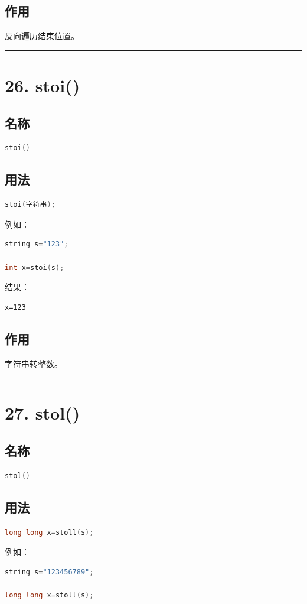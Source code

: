 \documentclass[9pt,twocolumn]{extarticle}
\begin{document}
\subsection{作用}
反向遍历结束位置。

\noindent\rule{\linewidth}{0.4pt}

\section{26. stoi()}

\subsection{名称}
\begin{lstlisting}[language=C++]
stoi()
\end{lstlisting}

\subsection{用法}
\begin{lstlisting}[language=C++]
stoi(字符串);
\end{lstlisting}
例如：
\begin{lstlisting}[language=C++]
string s="123";

int x=stoi(s);
\end{lstlisting}
结果：
\begin{lstlisting}
x=123
\end{lstlisting}

\subsection{作用}
字符串转整数。

\noindent\rule{\linewidth}{0.4pt}

\section{27. stol()}

\subsection{名称}
\begin{lstlisting}[language=C++]
stol()
\end{lstlisting}

\subsection{用法}
\begin{lstlisting}[language=C++]
long long x=stoll(s);
\end{lstlisting}
例如：
\begin{lstlisting}[language=C++]
string s="123456789";

long long x=stoll(s);
\end{lstlisting}
\end{document}
